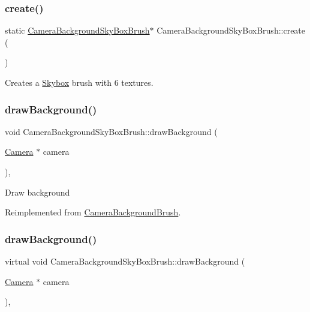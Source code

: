 \subsubsection{\texorpdfstring{create()}{create()}\hspace{0.1cm}{\footnotesize\ttfamily [4/4]}}
{\footnotesize\ttfamily static \hyperlink{classCameraBackgroundSkyBoxBrush}{Camera\+Background\+Sky\+Box\+Brush}$\ast$ Camera\+Background\+Sky\+Box\+Brush\+::create (\begin{DoxyParamCaption}{ }\end{DoxyParamCaption})\hspace{0.3cm}{\ttfamily [static]}}

Creates a \hyperlink{classSkybox}{Skybox} brush with 6 textures. \mbox{\label{classCameraBackgroundSkyBoxBrush_aa01f6019518a0428872e8307962647fa}} 
\subsubsection{\texorpdfstring{draw\+Background()}{drawBackground()}\hspace{0.1cm}{\footnotesize\ttfamily [1/2]}}
{\footnotesize\ttfamily void Camera\+Background\+Sky\+Box\+Brush\+::draw\+Background (\begin{DoxyParamCaption}\item[{\hyperlink{classCamera}{Camera} $\ast$}]{camera }\end{DoxyParamCaption})\hspace{0.3cm}{\ttfamily [override]}, {\ttfamily [virtual]}}

Draw background 

Reimplemented from \hyperlink{classCameraBackgroundBrush_aa079883211a8ebabf567a1967b325087}{Camera\+Background\+Brush}.

\mbox{\label{classCameraBackgroundSkyBoxBrush_ac7f69194164c51712f6b2d556ce795c7}} 
\subsubsection{\texorpdfstring{draw\+Background()}{drawBackground()}\hspace{0.1cm}{\footnotesize\ttfamily [2/2]}}
{\footnotesize\ttfamily virtual void Camera\+Background\+Sky\+Box\+Brush\+::draw\+Background (\begin{DoxyParamCaption}\item[{\hyperlink{classCamera}{Camera} $\ast$}]{camera }\end{DoxyParamCaption})\hspace{0.3cm}{\ttfamily [override]}, {\ttfamily [virtual]}}

